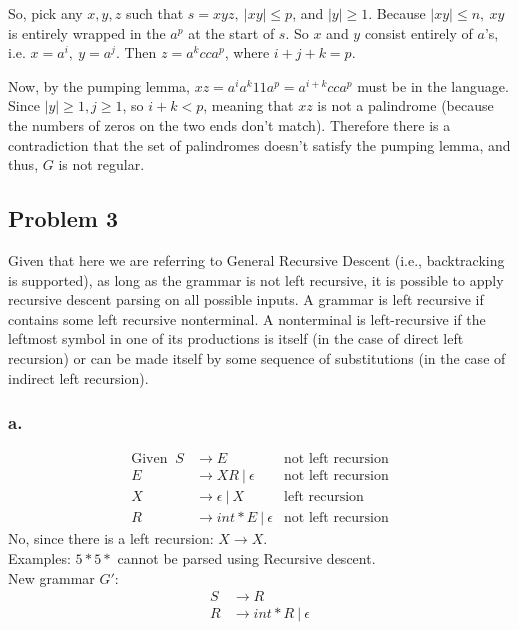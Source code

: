\documentclass{article}
\begin{document}
	So, pick any $x, y, z$ such that $s = xyz,\ |xy| \le p$, and $|y| \ge 1$. Because $|xy| \le n,\ xy$ is entirely wrapped in the $a^p$ at the start of $s$. So $x$ and $y$ consist entirely of $a$'s, i.e. $x = a^i,\  y = a^j$. Then $z = a^kcca^p$, where $i + j + k = p$.
	
	Now, by the pumping lemma, $xz= a^ia^k11a^p = a^{i+k}cca^p$ must be in the language. Since $|y| \ge 1, j \ge 1$, so $i + k < p$, meaning that $xz$ is not a palindrome (because the numbers of zeros on the two ends don't match). Therefore there is a contradiction that the set of palindromes doesn't satisfy the pumping lemma, and thus, $G$  is not regular.
	
	\newpage
	\subsection*{Problem 3}
	Given that here we are referring to General Recursive Descent (i.e., backtracking is supported), as long as the grammar is not left recursive, it is possible to apply recursive descent parsing on all possible inputs. A grammar is left recursive if contains some left recursive nonterminal.  A nonterminal is left-recursive if the leftmost symbol in one of its productions is itself (in the case of direct left recursion) or can be made itself by some sequence of substitutions (in the case of indirect left recursion).
	\subsubsection*{a.}
	\begin{align*}
		\text{Given }\  
		S &\to E &\text{not left recursion} \\
		E &\to XR\ |\ \epsilon &\text{not left recursion} \\
		X &\to \epsilon\ |\ X &\text{left recursion}\\
		R &\to int * E\ |\ \epsilon &\text{not left recursion}
	\end{align*}
	No, since there is a left recursion: $X \to X$.\smallskip \\
	Examples: $5*5*$ cannot be parsed using Recursive descent. \smallskip\\
	New grammar $G'$:
	\begin{align*}
		S &\to R \\
		R &\to int * R\ |\ \epsilon 
	\end{align*}
	
\end{document}
